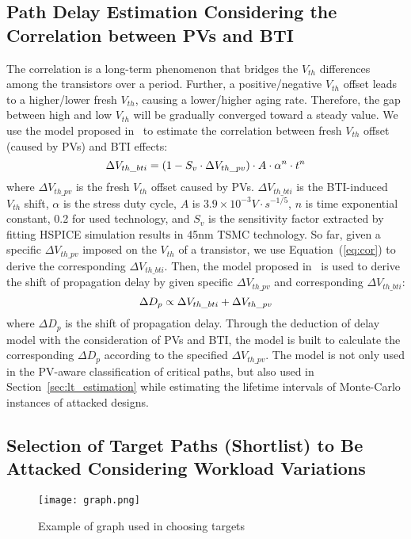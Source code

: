 \subsection{Path Delay Estimation Considering the Correlation between PVs and BTI}
\label{sec:frame:cor}
The correlation is a long-term phenomenon that bridges the $V_{th}$ differences among the transistors over a period. Further, a positive/negative $V_{th}$ offset leads to a higher/lower fresh $V_{th}$, causing a lower/higher aging rate. Therefore, the gap between high and low $V_{th}$ will be gradually converged toward a steady value. 
We use the model proposed in~\cite{gomez2016early} to estimate the correlation between fresh $V_{th}$ offset (caused by PVs) and BTI effects:
\begin{equation}
	\centering
	\fontsize{9}{9} \selectfont
	\Delta V_{th\_bti} = (1 - S_{v} \cdot \Delta V_{th\_pv})  \cdot A \cdot \alpha^n \cdot t^n
	\label{eq:cor}
\end{equation}
where $\Delta V_{th\_pv}$ is the fresh $V_{th}$ offset caused by PVs. $\Delta V_{th\_bti}$ is the BTI-induced $V_{th}$ shift, $\alpha$ is the stress duty cycle, $A$ is $3.9 \times 10^{-3} V \cdot s^{-1/5}$, $n$ is time exponential constant, 0.2 for used technology, and $S_{v}$ is the sensitivity factor extracted by fitting HSPICE simulation results in 45nm TSMC technology. So far, given a specific $\Delta V_{th\_pv}$ imposed on the $V_{th}$ of a transistor, we use Equation~(\ref{eq:cor}) to derive the corresponding $\Delta V_{th\_bti}$. Then, the model proposed in~\cite{wang2007efficient} is used to derive the shift of propagation delay by given specific $\Delta V_{th\_pv}$ and corresponding $\Delta V_{th\_bti}$:
\begin{equation}
	\centering
	\fontsize{9}{9} \selectfont
	\Delta D_{p} \propto \Delta V_{th\_bti} + \Delta V_{th\_pv}
	\label{eq:vtodelay}
\end{equation}	
where $\Delta D_{p}$ is the shift of propagation delay. Through the deduction of delay model with the consideration of PVs and BTI, the model is built to calculate the corresponding $\Delta D_{p}$ according to the specified $\Delta V_{th\_pv}$. The model is not only used in the PV-aware classification of critical paths, but also used in Section~\ref{sec:lt_estimation} while estimating the lifetime intervals of Monte-Carlo instances of attacked designs. 
\subsection{Selection of Target Paths (Shortlist) to Be Attacked Considering Workload Variations}
\label{sec:frame:workload}
\begin{figure}
	\centering
	\texttt{[image: graph.png]}
	\caption{Example of graph used in choosing targets}
	\label{fig:graph}
\end{figure}

